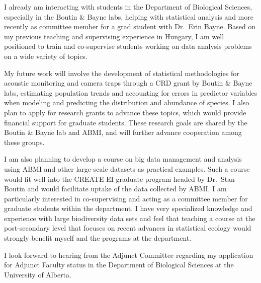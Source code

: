 \documentclass[11pt,letterpaper,roman]{moderncv}
\begin{document}
I already am interacting with students in the Department of Biological Sciences, especially in the Boutin \& Bayne labs, helping with statistical analysis and more recently as committee member for a grad student with Dr.~Erin Bayne. Based on my previous teaching and supervising experience in Hungary, I am well positioned to train and co-supervise students working on data analysis problems on a wide variety of topics.
\vspace{0.1pc}

My future work will involve the development of statistical methodologies for acoustic monitoring and camera traps through a CRD grant by Boutin \& Bayne labs, estimating population trends and accounting for errors in predictor variables when modeling and predicting the distribution and abundance of species. I also plan to apply for research grants to advance these topics, which would provide financial support for graduate students. These research goals are shared by the Boutin \& Bayne lab and ABMI, and will further advance cooperation among these groups. 
\vspace{0.1pc}

I am also planning to develop a course on big data management and analysis using ABMI and other large-scale datasets as practical examples. Such a course would fit well into the CREATE EI graduate program headed by Dr.~Stan Boutin and would facilitate uptake of the data collected by ABMI. I am particularly interested in co-supervising and acting as a committee member for graduate students within the department. I have very specialized knowledge and experience with large biodiversity data sets and feel that teaching a course at the post-secondary level that focuses on recent advances in statistical ecology would strongly benefit myself and the programs at the department.
\vspace{0.1pc}

I look forward to hearing from the Adjunct Committee regarding my application for Adjunct Faculty status in the Department of Biological Sciences at the University of Alberta. 
\vspace{0.1pc}

\makeletterclosingsigned
\vfill%
\\%
\\%
\\%
\end{document}
